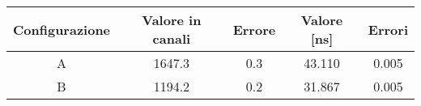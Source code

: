 \begin{center}
\begin{tabulary}{\textwidth}{CCCCC}
\toprule
Configurazione	& Valore in canali	& Errore	& Valore [ns]		& Errori	\\ \midrule
A		& 1647.3		& 0.3		& 43.110		& 0.005		\\ \midrule
B		& 1194.2		& 0.2		& 31.867		& 0.005		\\
\bottomrule
\end{tabulary}
\end{center} 
